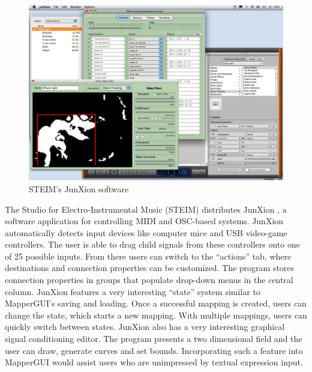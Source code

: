 \begin{figure}[h]
	\centering
		\includegraphics[width=\textwidth]{figures/junXion_v4}
		\caption{STEIM's JunXion software}
		\label{fig:junxion}
\end{figure}

The Studio for Electro-Instrumental Music (STEIM) distributes JunXion \cite{junxion}, a software application for controlling MIDI and OSC-based systems. JunXion automatically detects input devices like computer mice and USB video-game controllers. The user is able to drag child signals from these controllers onto one of 25 possible inputs.  From there users can switch to the ``actions'' tab, where destinations and connection properties can be customized. The program stores connection properties in groups that populate drop-down menus in the central column. JunXion features a very interesting ``state'' system similar to MapperGUI's saving and loading. Once a successful mapping is created, users can change the state, which starts a new mapping. With multiple mappings, users can quickly switch between states. JunXion also has a very interesting graphical signal conditioning editor. The program presents a two dimensional field and the user can draw, generate curves and set bounds. Incorporating such a feature into MapperGUI would assist users who are unimpressed by textual expression input.

